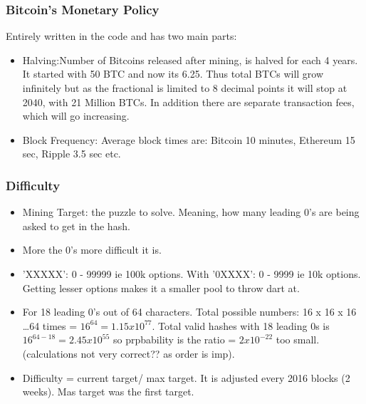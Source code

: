 \begin{frame}[fragile]\frametitle{Bitcoin's Monetary Policy}
Entirely written in the code and has two main parts:
\begin{itemize}
\item Halving:Number of Bitcoins released after mining, is halved for each 4 years. It started with 50 BTC and now its 6.25. Thus total BTCs will grow infinitely but as the fractional is limited to 8 decimal points it will stop at 2040, with 21 Million BTCs. In addition there are separate transaction fees, which will go increasing.
\item Block Frequency: Average block times are: Bitcoin 10 minutes, Ethereum 15 sec, Ripple 3.5 sec etc.
\end{itemize}
\end{frame}

\begin{frame}[fragile]\frametitle{Difficulty}
\begin{itemize}
\item Mining Target: the puzzle to solve. Meaning, how many leading 0's are being asked to get in the hash.
\item More the 0's more difficult it is.
\item 'XXXXX': 0 - 99999 ie 100k options. With '0XXXX': 0 - 9999 ie 10k options. Getting lesser options makes it a smaller pool to throw dart at.
\item For 18 leading 0's out of 64 characters. Total possible numbers: 16 x 16 x 16 \ldots 64 times = $16^{64}=1.15x10^{77}$. Total valid hashes with 18 leading 0s is $16^{64-18} = 2.45x10^{55}$ so prpbability is the ratio = $2x10^{-22}$ too small. (calculations not very correct?? as order is imp).
\item Difficulty = current target/ max target. It is adjusted every 2016 blocks (2 weeks). Mas target was the first target.
\end{itemize}
\end{frame}

